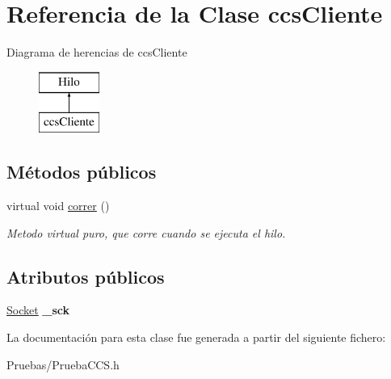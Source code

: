 \hypertarget{classccsCliente}{\section{\-Referencia de la \-Clase ccs\-Cliente}
\label{classccsCliente}
}
\-Diagrama de herencias de ccs\-Cliente\begin{figure}[H]
\begin{center}
\leavevmode
\includegraphics[height=2.000000cm]{classccsCliente}
\end{center}
\end{figure}
\subsection*{\-Métodos públicos}
\begin{DoxyCompactItemize}
\item 
\hypertarget{classccsCliente_aa0797528dcd3b5aa3162c0efe49a890c}{virtual void \hyperlink{classccsCliente_aa0797528dcd3b5aa3162c0efe49a890c}{correr} ()}\label{classccsCliente_aa0797528dcd3b5aa3162c0efe49a890c}

\begin{DoxyCompactList}\small\item\em \-Metodo virtual puro, que corre cuando se ejecuta el hilo. \end{DoxyCompactList}\end{DoxyCompactItemize}
\subsection*{\-Atributos públicos}
\begin{DoxyCompactItemize}
\item 
\hypertarget{classccsCliente_ad830df2e24f6b4d78db9a5dfbaa1adf3}{\hyperlink{classSocket}{\-Socket} {\bfseries \-\_\-sck}}\label{classccsCliente_ad830df2e24f6b4d78db9a5dfbaa1adf3}

\end{DoxyCompactItemize}


\-La documentación para esta clase fue generada a partir del siguiente fichero\-:\begin{DoxyCompactItemize}
\item 
\-Pruebas/\-Prueba\-C\-C\-S.\-h\end{DoxyCompactItemize}

